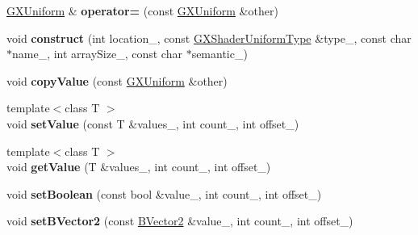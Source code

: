 \begin{DoxyCompactItemize}
\item 
\hyperlink{class_i_dream_sky_1_1_g_x_uniform}{G\+X\+Uniform} \& {\bfseries operator=} (const \hyperlink{class_i_dream_sky_1_1_g_x_uniform}{G\+X\+Uniform} \&other)\hypertarget{class_i_dream_sky_1_1_g_x_uniform_a36985cccca56d88875ad101823e7179b}{}\label{class_i_dream_sky_1_1_g_x_uniform_a36985cccca56d88875ad101823e7179b}

\item 
void {\bfseries construct} (int location\+\_\+, const \hyperlink{class_i_dream_sky_1_1_g_x_shader_uniform_type}{G\+X\+Shader\+Uniform\+Type} \&type\+\_\+, const char $\ast$name\+\_\+, int array\+Size\+\_\+, const char $\ast$semantic\+\_\+)\hypertarget{class_i_dream_sky_1_1_g_x_uniform_a02ce24bbc2b6c6cecf9251e621e141a2}{}\label{class_i_dream_sky_1_1_g_x_uniform_a02ce24bbc2b6c6cecf9251e621e141a2}

\item 
void {\bfseries copy\+Value} (const \hyperlink{class_i_dream_sky_1_1_g_x_uniform}{G\+X\+Uniform} \&other)\hypertarget{class_i_dream_sky_1_1_g_x_uniform_a7bd36eba67f47a0ab30c449309106834}{}\label{class_i_dream_sky_1_1_g_x_uniform_a7bd36eba67f47a0ab30c449309106834}

\item 
{\footnotesize template$<$class T $>$ }\\void {\bfseries set\+Value} (const T \&values\+\_\+, int count\+\_, int offset\+\_)\hypertarget{class_i_dream_sky_1_1_g_x_uniform_aaddbec8bea54765f1dbebabcff59e236}{}\label{class_i_dream_sky_1_1_g_x_uniform_aaddbec8bea54765f1dbebabcff59e236}

\item 
{\footnotesize template$<$class T $>$ }\\void {\bfseries get\+Value} (T \&values\+\_\+, int count\+\_, int offset\+\_)\hypertarget{class_i_dream_sky_1_1_g_x_uniform_ac2286df474f670b48d026a7bbb8b4f1f}{}\label{class_i_dream_sky_1_1_g_x_uniform_ac2286df474f670b48d026a7bbb8b4f1f}

\item 
void {\bfseries set\+Boolean} (const bool \&value\+\_\+, int count\+\_, int offset\+\_)\hypertarget{class_i_dream_sky_1_1_g_x_uniform_a114519840ab35f5b28ae1d7bc7dc2c79}{}\label{class_i_dream_sky_1_1_g_x_uniform_a114519840ab35f5b28ae1d7bc7dc2c79}

\item 
void {\bfseries set\+B\+Vector2} (const \hyperlink{class_i_dream_sky_1_1_b_vector2}{B\+Vector2} \&value\+\_\+, int count\+\_, int offset\+\_)\hypertarget{class_i_dream_sky_1_1_g_x_uniform_afadadc0b0daba6ef662ad84bc3e699fd}{}\label{class_i_dream_sky_1_1_g_x_uniform_afadadc0b0daba6ef662ad84bc3e699fd}


\end{DoxyCompactItemize}
